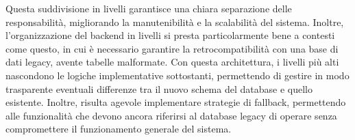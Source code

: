 Questa suddivisione in livelli garantisce una chiara separazione delle responsabilità, migliorando la manutenibilità e la scalabilità del sistema. Inoltre, l'organizzazione del backend in livelli si presta particolarmente bene a contesti come questo, in cui è necessario garantire la retrocompatibilità con una base di dati legacy, avente tabelle malformate. Con questa architettura, i livelli più alti nascondono le logiche implementative sottostanti, permettendo di gestire in modo trasparente eventuali differenze tra il nuovo schema del database e quello esistente. Inoltre, risulta agevole implementare strategie di fallback, permettendo alle funzionalità che devono ancora riferirsi al database legacy di operare senza compromettere il funzionamento generale del sistema.
